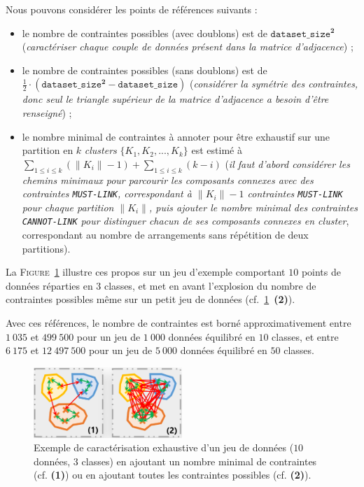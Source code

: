 			\begin{leftBarAuthorOpinion}
				Nous pouvons considérer les points de références suivants :
				\begin{itemize}
					\item le nombre de contraintes possibles (avec doublons) est de $\texttt{dataset\_size}^{\textbf{2}}$ (\textit{caractériser chaque couple de données présent dans la matrice d'adjacence}) ;
					\item le nombre de contraintes possibles (sans doublons) est de $\frac{1}{2} \cdot (\texttt{dataset\_size}^{\textbf{2}} - \texttt{dataset\_size})$ (\textit{considérer la symétrie des contraintes, donc seul le triangle supérieur de la matrice d'adjacence a besoin d'être renseigné}) ;
					\item le nombre minimal de contraintes à annoter pour être exhaustif sur une partition en $k$ \textit{clusters} $\{K_{1}, K_{2}, ..., K_{k}\} $ est estimé à ${\displaystyle \sum\limits_{1 \leq i \leq k}{(\|K_{i}\|-1)} + \sum\limits_{1 \leq i \leq k}{(k-i)}} $
					(\textit{il faut d'abord considérer les chemins minimaux pour parcourir les composants connexes avec des contraintes \texttt{MUST-LINK}, correspondant à $\|K_{i}\|-1$ contraintes \texttt{MUST-LINK} pour chaque partition $\|K_{i}\|$, puis ajouter le nombre minimal des contraintes \texttt{CANNOT-LINK} pour distinguer chacun de ses composants connexes en \textit{cluster}}, correspondant au nombre de arrangements sans répétition de deux partitions).
				\end{itemize}
				La \textsc{Figure~\ref{figure:4.3.3-ETUDE-COUT-NOMBRE-CONTRAINTES-EXEMPLES}} illustre ces propos sur un jeu d'exemple comportant $10$ points de données réparties en $3$ classes, et met en avant l'explosion du nombre de contraintes possibles même sur un petit jeu de données (cf.~\ref{figure:4.3.3-ETUDE-COUT-NOMBRE-CONTRAINTES-EXEMPLES}~\textbf{(2)}).
				
				Avec ces références, le nombre de contraintes est borné approximativement
				entre $1~035$ et $499~500$ pour un jeu de $1~000$ données équilibré en $10$ classes,
				et entre $6~175$ et $12~497~500$ pour un jeu de $5~000$ données équilibré en $50$ classes.
				\begin{figure}[H]
					\centering
					\includegraphics[width=0.5\textwidth]{figures/etude-nombre-contraintes-2-bornes-limites}
					\caption{
						Exemple de caractérisation exhaustive d'un jeu de données ($10$ données, $3$ classes) en ajoutant un nombre minimal de contraintes (cf. \textbf{(1)}) ou en ajoutant toutes les contraintes possibles (cf. \textbf{(2)}).
					}
					\label{figure:4.3.3-ETUDE-COUT-NOMBRE-CONTRAINTES-EXEMPLES}
				\end{figure}
			\end{leftBarAuthorOpinion}

